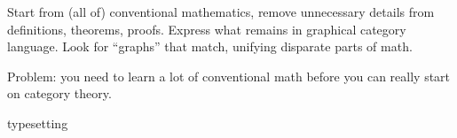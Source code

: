 \documentclass[11pt,openany]{article}
\def \texFolder {../../tex/}
\begin{document}
Start from (all of) conventional mathematics,
remove unnecessary details from definitions, theorems, proofs.
Express what remains in graphical category language.
Look for ``graphs'' that match, unifying disparate parts of math.

Problem: you need to learn a lot of conventional math before
you can really start on category theory.

 
\pagebreak
\appendix
{typesetting}


%
\printbibliography[heading=bibintoc, title={References}]
\end{document}
